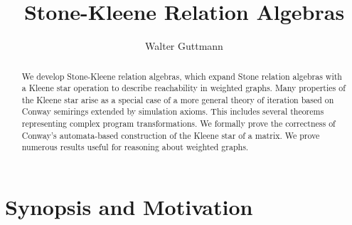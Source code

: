 \documentclass[11pt,a4paper]{article}
\begin{document}
\title{Stone-Kleene Relation Algebras}
\author{Walter Guttmann}
\maketitle

\begin{abstract}
  We develop Stone-Kleene relation algebras, which expand Stone relation algebras with a Kleene star operation to describe reachability in weighted graphs.
  Many properties of the Kleene star arise as a special case of a more general theory of iteration based on Conway semirings extended by simulation axioms.
  This includes several theorems representing complex program transformations.
  We formally prove the correctness of Conway's automata-based construction of the Kleene star of a matrix.
  We prove numerous results useful for reasoning about weighted graphs.
\end{abstract}

\tableofcontents

\section{Synopsis and Motivation}
\end{document}
